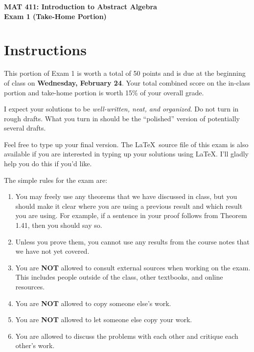 \documentclass[11pt]{article}
\theoremstyle{definition}
\begin{document}
\begin{center}

{\Large\bf MAT 411: Introduction to Abstract Algebra}\\
\smallskip
{\Large\bf Exam 1 (Take-Home Portion)}

\bigskip

  
  \bigskip
  

\end{center}

\section*{Instructions}

This portion of Exam 1 is worth a total of 50 points and is due at the beginning of class on \textbf{Wednesday, February 24}.  Your total combined score on the in-class portion and take-home portion is worth 15\% of your overall grade.  

\bigskip

I expect your solutions to be \emph{well-written, neat, and organized}.  Do not turn in rough drafts.  What you turn in should be the ``polished'' version of potentially several drafts.  
 
\bigskip

Feel free to type up your final version.  The \LaTeX\ source file of this exam is also available if you are interested in typing up your solutions using \LaTeX.  I'll gladly help you do this if you'd like.

\bigskip

The simple rules for the exam are:

\begin{enumerate}
\item You may freely use any theorems that we have discussed in class, but you should make it clear where you are using a previous result and which result you are using.  For example, if a sentence in your proof follows from Theorem 1.41, then you should say so.
\item Unless you prove them, you cannot use any results from the course notes that we have not yet covered.
\item You are \textbf{NOT} allowed to consult external sources when working on the exam.  This includes people outside of the class, other textbooks, and online resources.
\item You are \textbf{NOT} allowed to copy someone else's work.
\item You are \textbf{NOT} allowed to let someone else copy your work.
\item You are allowed to discuss the problems with each other and critique each other's work.
\end{enumerate}
\end{document}
